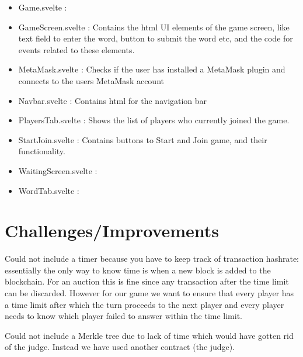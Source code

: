 \documentclass{article}
\begin{document}
\begin{itemize}
    \item Game.svelte : 
    \item GameScreen.svelte : Contains the html UI elements of the game screen, like text field to enter the word, button to submit the word etc, and the code for events related to these elements. 
    \item MetaMask.svelte : Checks if the user has installed a MetaMask plugin and connects to the users MetaMask account
    \item Navbar.svelte : Contains html for the navigation bar
    \item PlayersTab.svelte : Shows the list of players who currently joined the game.
    \item StartJoin.svelte : Contains buttons to Start and Join game, and their functionality. 
    \item WaitingScreen.svelte : 
    \item WordTab.svelte : 
\end{itemize}


\section {Challenges/Improvements}
Could not include a timer because you have to keep track of transaction hashrate:
essentially the only way to know time is when a new block is added to the blockchain. For an auction this is fine since any transaction after the time limit can be discarded. However for our game we want to ensure that every player has a time limit after which the turn proceeds to the next player and every player needs to know which player failed to answer within the time limit. 

Could not include a Merkle tree due to lack of time which would have gotten rid of the judge. Instead we have used another contract (the judge).
\end{document}
